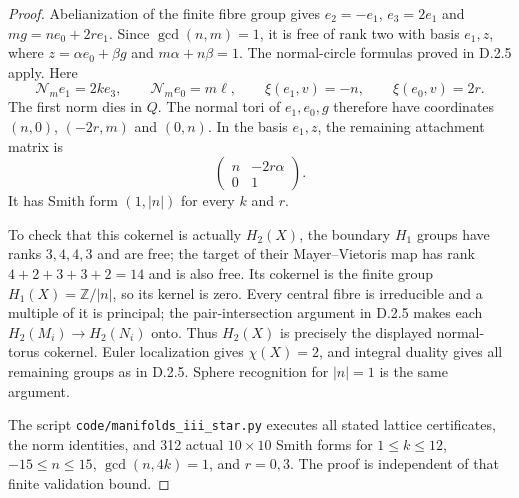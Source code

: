 \begin{proof}
Abelianization of the finite fibre group gives
$e_2=-e_1$, $e_3=2e_1$ and
$mg=ne_0+2r e_1$. Since $\gcd(n,m)=1$, it is free of rank
two with basis $e_1,z$, where
$z=\alpha e_0+\beta g$ and $m\alpha+n\beta=1$.
The normal-circle formulas proved in D.2.5 apply. Here
\[
 \mathcal N_me_1=2k e_3,\qquad
 \mathcal N_me_0=m\ell,\qquad
 \xi(e_1,v)=-n,\qquad \xi(e_0,v)=2r.
\]
The first norm dies in $Q$. The normal tori of $e_1,e_0,g$
therefore have coordinates $(n,0)$, $(-2r,m)$ and $(0,n)$.
In the basis $e_1,z$, the remaining attachment matrix is
\[
 \begin{pmatrix}n&-2r\alpha\\0&1\end{pmatrix}.
\]
It has Smith form $(1,|n|)$ for every $k$ and $r$.

To check that this cokernel is actually $H_2(X)$, the boundary
$H_1$ groups have ranks $3,4,4,3$ and are free; the target
of their Mayer--Vietoris map has rank
$4+2+3+3+2=14$ and is also free. Its cokernel is the finite
group $H_1(X)=\mathbb Z/|n|$, so its kernel is zero.
Every central fibre is irreducible and a multiple of it is
principal; the pair-intersection argument in D.2.5 makes each
$H_2(M_i)\to H_2(N_i)$ onto. Thus $H_2(X)$ is precisely
the displayed normal-torus cokernel. Euler localization gives
$\chi(X)=2$, and integral duality gives all remaining groups
as in D.2.5. Sphere recognition for $|n|=1$ is the same argument.

The script \texttt{code/manifolds\_iii\_star.py} executes all
stated lattice certificates, the norm identities, and 312 actual
$10\times10$ Smith forms for $1\leq k\leq12$,
$-15\leq n\leq15$, $\gcd(n,4k)=1$, and $r=0,3$.
The proof is independent of that finite validation bound.
\end{proof}

